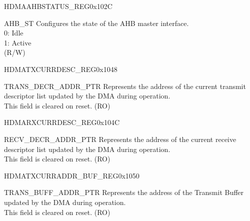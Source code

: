 \begin{register}{H}{DMAAHBSTATUS\_REG}{0x102C}\label{regdesc:DMAHBSTATUSREG}
%
%
\regnewline%
\begin{regdesc}\begin{reglist}
\item [AHB\_ST] Configures the state of the AHB master interface.\\
0: Idle\\
1: Active\\(R/W)
\end{reglist}\end{regdesc}
\end{register}


\begin{register}{H}{DMATXCURRDESC\_REG}{0x1048}\label{regdesc:DMATXCURRDESCREG}
%
\regnewline%
\begin{regdesc}\begin{reglist}
\item [TRANS\_DECR\_ADDR\_PTR] Represents the address of the current transmit descriptor list updated by the DMA during operation.\\
This field is cleared on reset. (RO)
\end{reglist}\end{regdesc}
\end{register}


\begin{register}{H}{DMARXCURRDESC\_REG}{0x104C}\label{regdesc:DMARXCURRDESCREG}
%
\regnewline%
\begin{regdesc}\begin{reglist}
\item [RECV\_DECR\_ADDR\_PTR] Represents the address of the current receive descriptor list updated by the DMA during operation.\\
This field is cleared on reset. (RO)
\end{reglist}\end{regdesc}
\end{register}


\begin{register}{H}{DMATXCURRADDR\_BUF\_REG}{0x1050}\label{regdesc:DMATXCURRADDRBUFREG}
%
\regnewline%
\begin{regdesc}\begin{reglist}
\item [TRANS\_BUFF\_ADDR\_PTR] Represents the address of the Transmit Buffer updated by the DMA during operation.\\
This field is cleared on reset. (RO)
\end{reglist}\end{regdesc}
\end{register}

